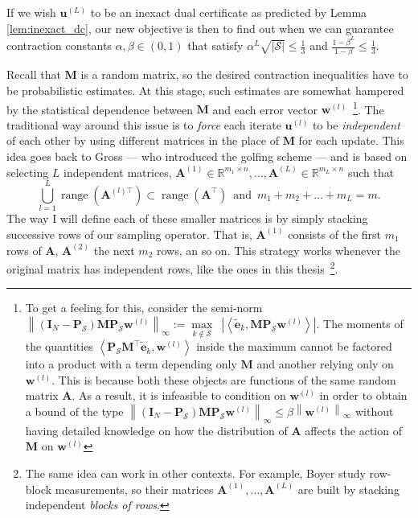 \endgroup
If we wish $\mathbf{u}^{(L)}$ to be an inexact dual certificate as predicted by Lemma \ref{lem:inexact_dc}, our new objective is then to find out when we can guarantee contraction constants $\alpha, \beta \in (0,1)$ that satisfy $\alpha^{L} \sqrt{|\mathcal{S}|} \leq \frac{1}{3}$ and $\frac{1 - \beta^L}{1 - \beta} \leq \frac{1}{3}$.

Recall that $\mathbf{M}$ is a random matrix, so the desired contraction inequalities have to be probabilistic estimates. At this stage, such estimates are somewhat hampered by the statistical dependence between $\mathbf{M}$ and each error vector $\mathbf{w}^{(l)}$~\footnote{To get a feeling for this, consider the semi-norm $\left \| \left(\mathbf{I}_N - \mathbf{P}_\mathcal{S}\right) \mathbf{M} \mathbf{P}_{\mathcal{S}} \mathbf{w}^{(l)} \right \|_{\infty} := \underset{k \notin \mathcal{S}}{\max} \enspace \left | \left \langle \tilde{\mathbf{e}}_k, \mathbf{M} \mathbf{P}_{\mathcal{S}} \mathbf{w}^{(l)} \right \rangle \right |$. The moments of the quantities $\left \langle \mathbf{P}_{\mathcal{S}} \mathbf{M}^\top \tilde{\mathbf{e}}_k, \mathbf{w}^{(l)} \right \rangle$
inside the maximum cannot be factored into a product with a term depending only $\mathbf{M}$ and another relying only on $\mathbf{w}^{(l)}$. This is because both these objects are functions of the same random matrix $\mathbf{A}$. As a result, it is infeasible to condition on $\mathbf{w}^{(l)}$ in order to obtain a bound of the type $\left \| \left(\mathbf{I}_N - \mathbf{P}_\mathcal{S}\right) \mathbf{M} \mathbf{P}_{\mathcal{S}} \mathbf{w}^{(l)} \right \|_{\infty} \leq \beta \left \| \mathbf{w}^{(l)} \right \|_{\infty}$ without having detailed knowledge on how the distribution of $\mathbf{A}$ affects the action of $\mathbf{M}$ on $\mathbf{w}^{(l)}$}. The traditional way around this issue is to \emph{force} each iterate $\mathbf{u}^{(l)}$ to be \emph{independent} of each other by using different matrices in the place of $\mathbf{M}$ for each update. This idea goes back to Gross \cite{gross2011} --- who introduced the golfing scheme --- and is based on selecting $L$ independent matrices, $\mathbf{A}^{(1)} \in \mathbb{R}^{m_1 \times n}, \dots, \mathbf{A}^{(L)} \in \mathbb{R}^{m_L \times n}$ such that
\begin{equation}
    \bigcup_{l=1}^{L} \operatorname{range} \left( \mathbf{A}^{(l)\top} \right) \subset \operatorname{range} \left( \mathbf{A}^{\top} \right) \enspace \text{and} \enspace m_1 + m_2 + \dots + m_L = m.
\end{equation}
The way I will define each of these smaller matrices is by simply stacking successive rows of our sampling operator. That is, $\mathbf{A}^{(1)}$ consists of the first $m_1$ rows of $\mathbf{A}$, $\mathbf{A}^{(2)}$ the next $m_2$ rows, an so on. This strategy works whenever the original matrix has independent rows, like the ones in this thesis~\footnote{The same idea can work in other contexts. For example, Boyer \etal \cite{boyer2019} study row-block measurements, so their matrices $\mathbf{A}^{(1)}, \dots, \mathbf{A}^{(L)}$ are built by stacking independent \emph{blocks of rows}.}.

